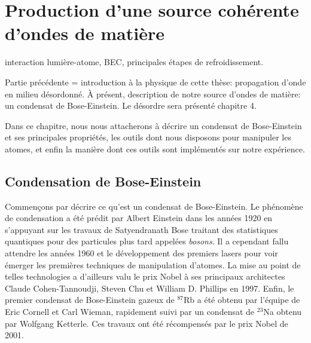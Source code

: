\chapter{Production d'une source cohérente d'ondes de matière}
\label{ch:BEC_manip}


interaction lumière-atome, BEC, principales étapes de refroidissement. 

Partie précédente = introduction à la physique de cette thèse: propagation d'onde en milieu désordonné. À présent, description de notre source d'ondes de matière: un condensat de Bose-Einstein. Le désordre sera présenté chapitre 4. 

Dans ce chapitre, nous nous attacherons à décrire un condensat de Bose-Einstein et ses principales propriétés, les outils dont nous disposons pour manipuler les atomes, et enfin la manière dont ces outils sont implémentés sur notre expérience.

\section{Condensation de Bose-Einstein}
Commençons par décrire ce qu'est un condensat de Bose-Einstein. Le phénomène de condensation a été prédit par Albert Einstein dans les années 1920 en s'appuyant sur les travaux de Satyendranath Bose traitant des statistiques quantiques pour des particules plus tard appelées \emph{bosons}. Il a cependant fallu attendre les années 1960 et le développement des premiers lasers pour voir émerger les premières techniques de manipulation d'atomes. La mise au point de telles technologies a d'ailleurs valu le prix Nobel à ses principaux architectes Claude Cohen-Tannoudji, Steven Chu et William D. Phillips en 1997. Enfin, le premier condensat de Bose-Einstein gazeux de ${}^{87}$Rb a été obtenu par l'équipe de Eric Cornell et Carl Wieman, rapidement suivi par un condensat de ${}^{23}$Na obtenu par Wolfgang Ketterle. Ces travaux ont été récompensés par le prix Nobel de 2001.

